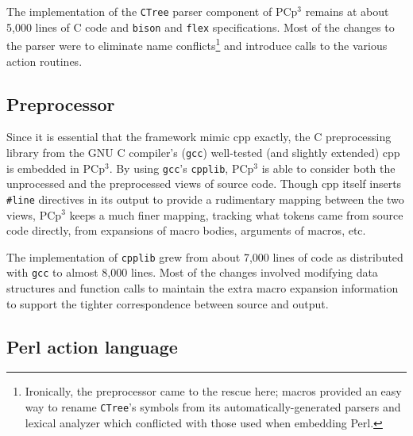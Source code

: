 \documentclass{article}
\newcommand{\pcp}{\mbox{\textsf{PCp}$^3$}}
\newcommand{\Cpp}{\mbox{\textsf{cpp}}}
\newcommand{\Perl}{\mbox{Perl}}
\newcommand{\C}{\mbox{C}}
\newcommand{\ppd}[1]{\texttt{\##1}}
\newcommand{\etc}{etc}  %
\begin{document}
The implementation of the \texttt{CTree} parser component of \pcp{}
remains at about 5,000 lines of \C{} code and \texttt{bison} and
\texttt{flex} specifications.  Most of the changes to the parser were to
eliminate name conflicts\footnote{Ironically, the preprocessor came to the
  rescue here; macros provided an easy way to rename \texttt{CTree}'s
  symbols from its automatically-generated parsers and lexical analyzer
  which conflicted with those used when embedding \Perl{}.}  and
introduce calls to the various action routines.

\subsection{Preprocessor}


Since it is essential that the framework mimic \Cpp{}
exactly, the \C{} preprocessing library from the GNU \C{}
compiler's (\texttt{gcc}) well-tested (and slightly extended)
\Cpp{}~\cite{GCC} is embedded in \pcp{}.  By using \texttt{gcc}'s
\texttt{cpplib}, \pcp{} is able to consider both the unprocessed and
the preprocessed views of source code.  Though \Cpp{} itself inserts
\ppd{line} directives in its output to provide a rudimentary mapping
between the two views, \pcp{} keeps a much finer mapping, tracking
what tokens came from source code directly, from expansions of macro
bodies, arguments of macros, \etc.


The implementation of \texttt{cpplib} grew from about 7,000 lines of
code as distributed with \texttt{gcc} to almost 8,000 lines.  Most of
the changes involved modifying data structures and function calls to
maintain the extra macro expansion information to support the
tighter correspondence between source and output.  

\subsection{Perl action language}
\end{document}
